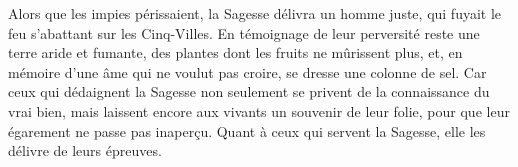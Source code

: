 Alors que les impies périssaient,
	la Sagesse délivra un homme juste, qui fuyait le feu s’abattant sur les Cinq-Villes.
En témoignage de leur perversité reste une terre aride et fumante,
	des plantes dont les fruits ne mûrissent plus,
	et, en mémoire d’une âme qui ne voulut pas croire, se dresse une colonne de sel.
Car ceux qui dédaignent la Sagesse
	non seulement se privent de la connaissance du vrai bien,
	mais laissent encore aux vivants un souvenir de leur folie,
	pour que leur égarement ne passe pas inaperçu.
Quant à ceux qui servent la Sagesse, elle les délivre de leurs épreuves.
